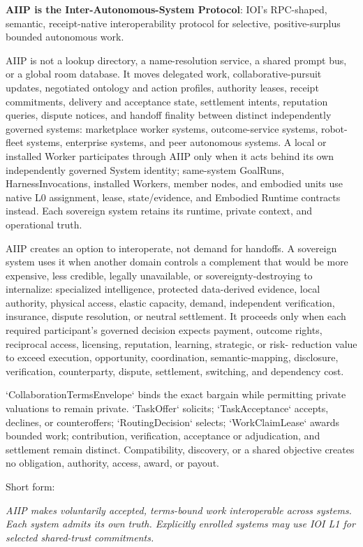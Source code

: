 \documentclass[
  11pt,
]{article}
\begin{document}
\textbf{AIIP is the Inter-Autonomous-System Protocol}: IOI's RPC-shaped,
semantic, receipt-native interoperability protocol for selective,
positive-surplus bounded autonomous work.

AIIP is not a lookup directory, a name-resolution service, a shared prompt
bus, or a global room database. It moves delegated work,
collaborative-pursuit updates, negotiated ontology and action profiles,
authority leases, receipt commitments, delivery and acceptance state,
settlement intents, reputation queries, dispute notices, and handoff finality
between distinct independently governed systems: marketplace worker systems,
outcome-service systems, robot-fleet systems, enterprise systems, and peer
autonomous systems. A local or installed Worker participates through AIIP only
when it acts behind its own independently governed System identity; same-system
GoalRuns, HarnessInvocations, installed Workers, member nodes, and embodied
units use native L0 assignment, lease, state/evidence, and Embodied Runtime
contracts instead. Each sovereign system retains its runtime, private context,
and operational truth.

AIIP creates an option to interoperate, not demand for handoffs. A sovereign
system uses it when another domain controls a complement that would be more
expensive, less credible, legally unavailable, or sovereignty-destroying to
internalize: specialized intelligence, protected data-derived evidence, local
authority, physical access, elastic capacity, demand, independent verification,
insurance, dispute resolution, or neutral settlement. It proceeds only when
each required participant's governed decision expects payment, outcome rights,
reciprocal access, licensing, reputation, learning, strategic, or risk-
reduction value to exceed execution, opportunity, coordination,
semantic-mapping, disclosure, verification, counterparty, dispute, settlement,
switching, and dependency cost.

`CollaborationTermsEnvelope` binds the exact bargain while permitting private
valuations to remain private. `TaskOffer` solicits; `TaskAcceptance` accepts,
declines, or counteroffers; `RoutingDecision` selects; `WorkClaimLease` awards
bounded work; contribution, verification, acceptance or adjudication, and
settlement remain distinct. Compatibility, discovery, or a shared objective
creates no obligation, authority, access, award, or payout.

Short form:

\begin{center}
\emph{AIIP makes voluntarily accepted, terms-bound work interoperable across
systems. Each system admits its own truth. Explicitly enrolled systems may use
IOI L1 for selected shared-trust commitments.}
\end{center}
\end{document}
